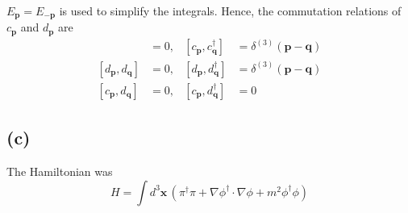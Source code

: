 \documentclass[a4paper,11pt]{article}
\begin{document}
$E_{\mathbf{p}}=E_{-\mathbf{p}}$ is used to simplify the integrals. Hence, the commutation relations of $c_{\mathbf{p}}$ and $d_{\mathbf{p}}$ are
\begin{align}
    [c_{\mathbf{p}}, c_{\mathbf{q}}] &= 0, & [c_{\mathbf{p}}, c_{\mathbf{q}}^\dagger] &= \delta^{(3)}(\mathbf{p}-\mathbf{q})\\
    [d_{\mathbf{p}}, d_{\mathbf{q}}] &= 0, & [d_{\mathbf{p}}, d_{\mathbf{q}}^\dagger] &= \delta^{(3)}(\mathbf{p}-\mathbf{q})\\
    [c_{\mathbf{p}}, d_{\mathbf{q}}] &= 0, & [c_{\mathbf{p}}, d_{\mathbf{q}}^\dagger] &= 0
\end{align}

\subsection{(c)} 

The Hamiltonian was
\begin{equation}
    H = \int d^3\mathbf{x}\, \left(\pi^\dagger\pi + \nabla\phi^\dagger\cdot\nabla\phi + m^2\phi^\dagger\phi\right)
\end{equation}
\end{document}
